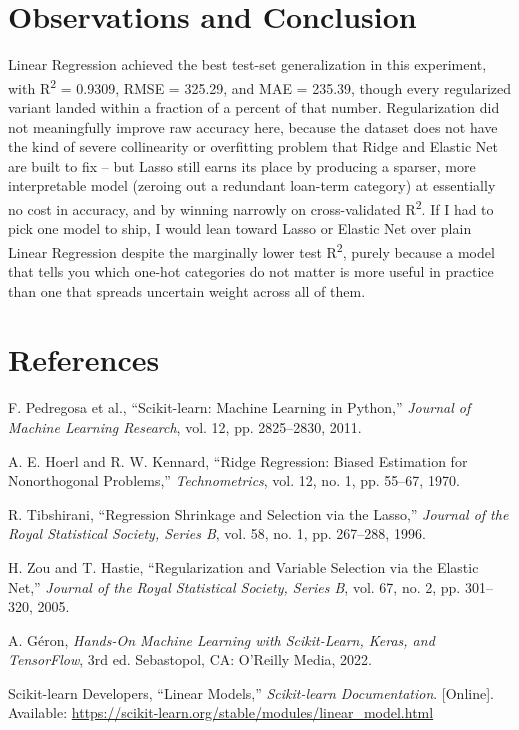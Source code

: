 \documentclass[11pt,a4paper]{article}
\begin{document}
\section{Observations and Conclusion}
Linear Regression achieved the best test-set generalization in this experiment, with R\textsuperscript{2} = 0.9309, RMSE = 325.29, and MAE = 235.39, though every regularized variant landed within a fraction of a percent of that number. Regularization did not meaningfully improve raw accuracy here, because the dataset does not have the kind of severe collinearity or overfitting problem that Ridge and Elastic Net are built to fix -- but Lasso still earns its place by producing a sparser, more interpretable model (zeroing out a redundant loan-term category) at essentially no cost in accuracy, and by winning narrowly on cross-validated R\textsuperscript{2}. If I had to pick one model to ship, I would lean toward Lasso or Elastic Net over plain Linear Regression despite the marginally lower test R\textsuperscript{2}, purely because a model that tells you which one-hot categories do not matter is more useful in practice than one that spreads uncertain weight across all of them.

\section{References}
\begin{enumerate}[label={[\arabic*]}]
\item F. Pedregosa et al., ``Scikit-learn: Machine Learning in Python,'' \emph{Journal of Machine Learning Research}, vol. 12, pp. 2825--2830, 2011.
\item A. E. Hoerl and R. W. Kennard, ``Ridge Regression: Biased Estimation for Nonorthogonal Problems,'' \emph{Technometrics}, vol. 12, no. 1, pp. 55--67, 1970.
\item R. Tibshirani, ``Regression Shrinkage and Selection via the Lasso,'' \emph{Journal of the Royal Statistical Society, Series B}, vol. 58, no. 1, pp. 267--288, 1996.
\item H. Zou and T. Hastie, ``Regularization and Variable Selection via the Elastic Net,'' \emph{Journal of the Royal Statistical Society, Series B}, vol. 67, no. 2, pp. 301--320, 2005.
\item A. G\'eron, \emph{Hands-On Machine Learning with Scikit-Learn, Keras, and TensorFlow}, 3rd ed. Sebastopol, CA: O'Reilly Media, 2022.
\item Scikit-learn Developers, ``Linear Models,'' \emph{Scikit-learn Documentation}. [Online]. Available: \url{https://scikit-learn.org/stable/modules/linear_model.html}
\end{enumerate}
\end{document}
